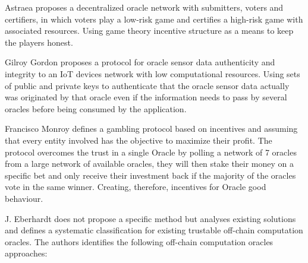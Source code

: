 Astraea \cite{Adler2018Astraea:Oracleb} proposes a decentralized oracle network with submitters, voters and certifiers, in which voters play a low-risk game and certifies a high-risk game with associated resources. Using game theory incentive structure as a means to keep the players honest.

Gilroy Gordon \cite{Gordon2017ProvenanceSensorsb} proposes a protocol for oracle sensor data authenticity and integrity to an IoT devices network with low computational resources. Using sets of public and private keys to authenticate that the oracle sensor data actually was originated by that oracle even if the information needs to pass by several oracles before being consumed by the application.

Francisco Monroy \cite{MontotoMonroy2018BitcoinBlockchain} defines a gambling protocol based on incentives and assuming that every entity involved has the objective to maximize their profit. The protocol overcomes the trust in a single Oracle by polling a network of 7 oracles from a large network of available oracles, they will then stake their money on a specific bet and only receive their investment back if the majority of the oracles vote in the same winner. Creating, therefore, incentives for Oracle good behaviour.

J. Eberhardt \cite{Eberhardt2018Off-chainingComputations} does not propose a specific method but analyses existing solutions and defines a systematic classification for existing trustable off-chain computation oracles. The authors identifies the following off-chain computation oracles approaches:

